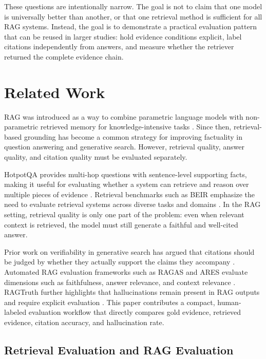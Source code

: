 \documentclass[10pt,twocolumn]{article}
\begin{document}
These questions are intentionally narrow. The goal is not to claim that one model is universally better than another, or that one retrieval method is sufficient for all RAG systems. Instead, the goal is to demonstrate a practical evaluation pattern that can be reused in larger studies: hold evidence conditions explicit, label citations independently from answers, and measure whether the retriever returned the complete evidence chain.

\section{Related Work}

RAG was introduced as a way to combine parametric language models with non-parametric retrieved memory for knowledge-intensive tasks \citep{lewis2020rag}. Since then, retrieval-based grounding has become a common strategy for improving factuality in question answering and generative search. However, retrieval quality, answer quality, and citation quality must be evaluated separately.

HotpotQA provides multi-hop questions with sentence-level supporting facts, making it useful for evaluating whether a system can retrieve and reason over multiple pieces of evidence \citep{yang2018hotpotqa}. Retrieval benchmarks such as BEIR emphasize the need to evaluate retrieval systems across diverse tasks and domains \citep{thakur2021beir}. In the RAG setting, retrieval quality is only one part of the problem: even when relevant context is retrieved, the model must still generate a faithful and well-cited answer.

Prior work on verifiability in generative search has argued that citations should be judged by whether they actually support the claims they accompany \citep{liu2023verifiability}. Automated RAG evaluation frameworks such as RAGAS and ARES evaluate dimensions such as faithfulness, answer relevance, and context relevance \citep{es2023ragas, saadfalcon2024ares}. RAGTruth further highlights that hallucinations remain present in RAG outputs and require explicit evaluation \citep{niu2024ragtruth}. This paper contributes a compact, human-labeled evaluation workflow that directly compares gold evidence, retrieved evidence, citation accuracy, and hallucination rate.

\subsection{Retrieval Evaluation and RAG Evaluation}
\end{document}

